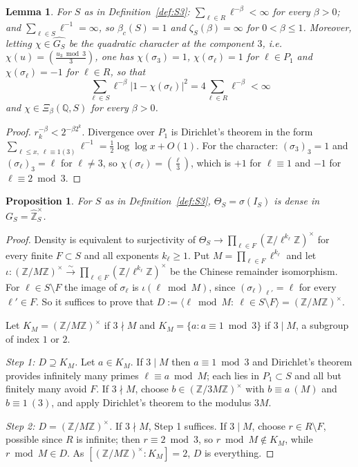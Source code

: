 \documentclass[11pt]{amsart}
\numberwithin{equation}{section}
\newtheorem{proposition}[theorem]{Proposition}
\newtheorem{lemma}[theorem]{Lemma}
\theoremstyle{definition}
\theoremstyle{remark}
\newcommand{\Z}{\mathbb{Z}}
\newcommand{\Q}{\mathbb{Q}}
\newcommand{\hZ}{\widehat{\Z}}
\newcommand{\Leg}[2]{\left(\frac{#1}{#2}\right)}
\begin{document}
\begin{lemma}\label{lem:S3basic}
For $S$ as in Definition~\ref{def:S3}: $\sum_{\ell\in R}\ell^{-\beta}<\infty$
for every $\beta>0$; and $\sum_{\ell\in S}\ell^{-1}=\infty$, so
$\beta_c(S)=1$ and $\zeta_S(\beta)=\infty$ for $0<\beta\le1$. Moreover, letting
$\chi\in\widehat{G_S}$ be the quadratic character at the component $3$, i.e.\
$\chi(u)=\Leg{u_3\bmod3}{3}$, one has $\chi(\sigma_3)=1$, $\chi(\sigma_\ell)=1$
for $\ell\in P_1$ and $\chi(\sigma_\ell)=-1$ for $\ell\in R$, so that
\[
\sum_{\ell\in S}\ell^{-\beta}\bigl|1-\chi(\sigma_\ell)\bigr|^2=4\sum_{\ell\in R}\ell^{-\beta}<\infty
\]
and $\chi\in\Xi_\beta(\Q,S)$ for every $\beta>0$.
\end{lemma}

\begin{proof}
$r_k^{-\beta}<2^{-\beta2^k}$. Divergence over $P_1$ is Dirichlet's theorem in
the form $\sum_{\ell\le x,\ \ell\equiv1(3)}\ell^{-1}=\tfrac12\log\log x+O(1)$.
For the character: $(\sigma_3)_3=1$ and $(\sigma_\ell)_3=\ell$ for
$\ell\neq3$, so $\chi(\sigma_\ell)=\Leg{\ell}{3}$, which is $+1$ for
$\ell\equiv1$ and $-1$ for $\ell\equiv2\bmod3$.
\end{proof}

\begin{proposition}\label{prop:dense}
For $S$ as in Definition~\ref{def:S3}, $\Theta_S=\sigma(I_S)$ is dense in
$G_S=\hZ_S^\times$.
\end{proposition}

\begin{proof}
Density is equivalent to surjectivity of
$\Theta_S\to\prod_{\ell\in F}(\Z/\ell^{k_\ell}\Z)^\times$ for every finite
$F\subset S$ and all exponents $k_\ell\ge1$. Put $M=\prod_{\ell\in F}\ell^{k_\ell}$
and let $\iota:(\Z/M\Z)^\times\xrightarrow{\sim}\prod_{\ell\in F}(\Z/\ell^{k_\ell}\Z)^\times$
be the Chinese remainder isomorphism. For $\ell\in S\setminus F$ the image of
$\sigma_\ell$ is $\iota(\ell\bmod M)$, since $(\sigma_\ell)_{\ell'}=\ell$
for every $\ell'\in F$. So it suffices to prove that
$D:=\langle\ell\bmod M:\ \ell\in S\setminus F\rangle=(\Z/M\Z)^\times$.

Let $K_M=(\Z/M\Z)^\times$ if $3\nmid M$ and
$K_M=\{a:a\equiv1\bmod3\}$ if $3\mid M$, a subgroup of index $1$ or $2$.

\emph{Step 1: $D\supseteq K_M$.} Let $a\in K_M$. If $3\mid M$ then
$a\equiv1\bmod3$ and Dirichlet's theorem provides infinitely many primes
$\ell\equiv a\bmod M$; each lies in $P_1\subset S$ and all but finitely many
avoid $F$. If $3\nmid M$, choose $b\in(\Z/3M\Z)^\times$ with $b\equiv a\ (M)$
and $b\equiv1\ (3)$, and apply Dirichlet's theorem to the modulus $3M$.

\emph{Step 2: $D=(\Z/M\Z)^\times$.} If $3\nmid M$, Step 1 suffices. If
$3\mid M$, choose $r\in R\setminus F$, possible since $R$ is infinite; then
$r\equiv2\bmod3$, so $r\bmod M\notin K_M$, while $r\bmod M\in D$. As
$[(\Z/M\Z)^\times:K_M]=2$, $D$ is everything.
\end{proof}
\end{document}
